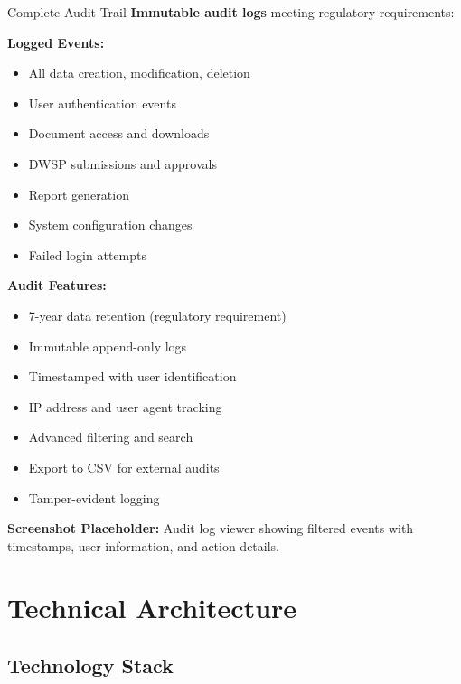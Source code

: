 \documentclass[11pt,a4paper]{article}
\begin{document}
\begin{featurebox}{Complete Audit Trail}
    \textbf{Immutable audit logs} meeting regulatory requirements:

    \vspace{0.5cm}
    \textbf{Logged Events:}
    \begin{itemize}[itemsep=0.2em]
        \item All data creation, modification, deletion
        \item User authentication events
        \item Document access and downloads
        \item DWSP submissions and approvals
        \item Report generation
        \item System configuration changes
        \item Failed login attempts
    \end{itemize}

    \vspace{0.5cm}
    \textbf{Audit Features:}
    \begin{itemize}[itemsep=0.2em]
        \item 7-year data retention (regulatory requirement)
        \item Immutable append-only logs
        \item Timestamped with user identification
        \item IP address and user agent tracking
        \item Advanced filtering and search
        \item Export to CSV for external audits
        \item Tamper-evident logging
    \end{itemize}
\end{featurebox}

\vspace{0.5cm}

\textbf{Screenshot Placeholder:} Audit log viewer showing filtered events with timestamps, user information, and action details.

\newpage

\section{Technical Architecture}

\subsection{Technology Stack}
\end{document}
